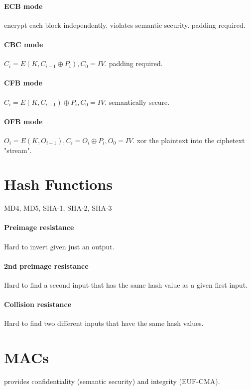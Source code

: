 \documentclass[11pt]{article}
\begin{document}
\paragraph{ECB mode} encrypt each block independently. violates semantic security. padding required.

\paragraph{CBC mode} $C_i = E(K, C_{i-1} \oplus P_i), C_0 = IV$. padding required.

\paragraph{CFB mode} $C_i = E(K, C_{i-1}) \oplus P_i, C_0 = IV$. semantically secure.

\paragraph{OFB mode} $O_i = E(K, O_{i-1}), C_i = O_i \oplus P_i, O_0 = IV$. xor the plaintext into the ciphetext "stream".

\section{Hash Functions} MD4, MD5, SHA-1, SHA-2, SHA-3

\paragraph{Preimage resistance} Hard to invert given just an output.

\paragraph{2nd preimage resistance} Hard to find a second input that has the same hash value as a given first input.

\paragraph{Collision resistance} Hard to find two different inputs that have the same hash values.

\section{MACs} provides confidentiality (semantic security) and integrity (EUF-CMA).
\end{document}
